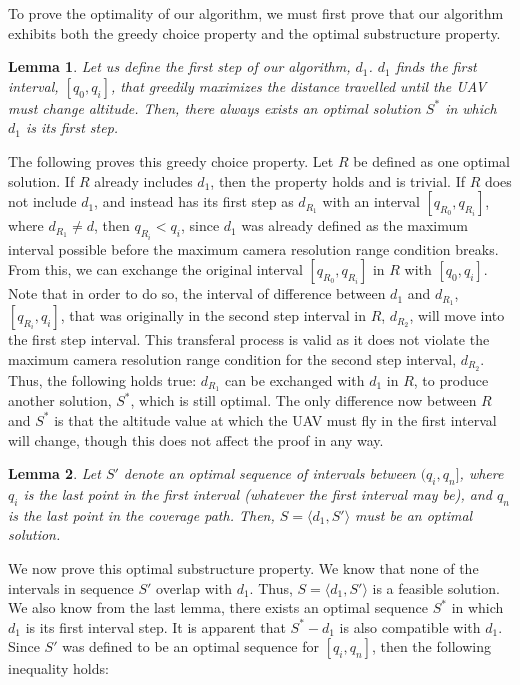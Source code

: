 \documentclass[conference]{IEEEtran}
\theoremstyle{plain}%
\newtheorem{lemma}{Lemma}
\begin{document}
To prove the optimality of our algorithm, we must first prove that our algorithm exhibits both the greedy choice property and the optimal substructure property.
\begin{lemma} %
Let us define the first step of our algorithm, $d_1$. $d_1$ finds the first interval, $[q_0, q_i]$, that greedily maximizes the distance travelled until the UAV must change altitude. Then, there always exists an optimal solution $S^*$ in which $d_1$ is its first step.
\end{lemma}
The following proves this greedy choice property. Let $R$ be defined as one optimal solution. If $R$ already includes $d_1$, then the property holds and is trivial. If $R$ does not include $d_1$, and instead has its first step as $d_{R_1}$ with an interval $[q_{R_0}, q_{R_i}]$, where $d_{R_1} \neq d$, then $q_{R_i} < q_i$, since $d_1$ was already defined as the maximum interval possible before the maximum camera resolution range condition breaks. From this, we can exchange the original interval $[q_{R_0}, q_{R_i}]$ in $R$ with $[q_0, q_i]$. Note that in order to do so, the interval of difference between $d_1$ and $d_{R_1}$, $[q_{R_i}, q_i]$, that was originally in the second step interval in $R$, $d_{R_2}$, will move into the first step interval. This transferal process is valid as it does not violate the maximum camera resolution range condition for the second step interval, $d_{R_2}$. Thus, the following holds true: $d_{R_1}$ can be exchanged with $d_1$ in $R$, to produce another solution, $S^*$, which is still optimal. The only difference now between $R$ and $S^*$ is that the altitude value at which the UAV must fly in the first interval will change, though this does not affect the proof in any way.
\begin{lemma} %
Let $S'$ denote an optimal sequence of intervals between $(q_i, q_n]$, where $q_i$ is the last point in the first interval (whatever the first interval may be), and $q_n$ is the last point in the coverage path. Then, $S = \langle d_1, S' \rangle$ must be an optimal solution.
\end{lemma}
We now prove this optimal substructure property. We know that none of the intervals in sequence $S'$ overlap with $d_1$. Thus, $S = \langle d_1, S' \rangle$ is a feasible solution. We also know from the last lemma, there exists an optimal sequence $S^*$ in which $d_1$ is its first interval step. It is apparent that $S^* - d_1$ is also compatible with $d_1$. Since $S'$ was defined to be an optimal sequence for $[q_i, q_n]$, then the following inequality holds:
\end{document}
